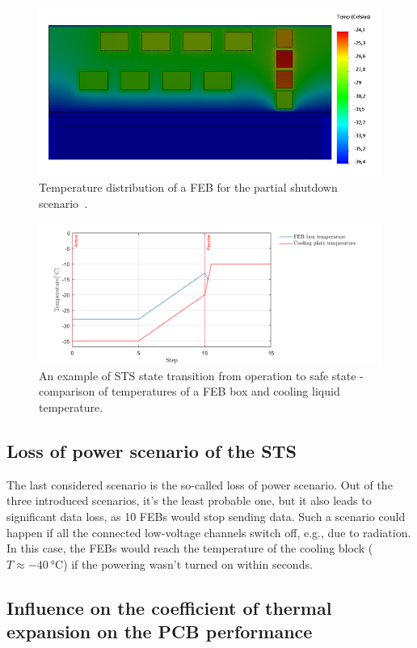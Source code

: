 \begin{figure}[!h]
\centering
\includegraphics[width=0.6\columnwidth]{Chapter4/images/reboot_FEB.png}
\caption{Temperature distribution of a \gls{FEB} for the partial shutdown scenario~\cite{Agarwal}.}
\label{fig_reboot_FEB}
\end{figure}

\begin{figure}[!h]
\centering
\includegraphics[width=0.85\columnwidth]{Chapter4/images/nominal.png}
\caption{An example of \gls{STS} state transition from operation to safe state - comparison of temperatures of a \gls{FEB} box and cooling liquid temperature.}
\label{fig_reboot_nominal2}
\end{figure}

\newpage
\subsection{Loss of power scenario of the STS}
\label{power_loss}
The last considered scenario is the so-called loss of power scenario. Out of the three introduced scenarios, it's the least probable one, but it also leads to significant data loss, as 10 \glspl{FEB} would stop sending data. Such a scenario could happen if all the connected low-voltage channels switch off, e.g., due to radiation. In this case, the \glspl{FEB} would reach the temperature of the cooling block ($T \approx \SI{-40}{\celsius}$) if the powering wasn't turned on within seconds.

\subsection{Influence on the coefficient of thermal expansion on the PCB performance}

